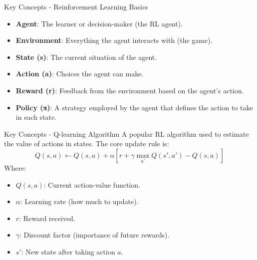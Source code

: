 \documentclass[aspectratio=169]{beamer}
\begin{document}
\begin{frame}{Key Concepts - Reinforcement Learning Basics}
    \begin{itemize}
        \item \textbf{Agent}: The learner or decision-maker (the RL agent).
        \item \textbf{Environment}: Everything the agent interacts with (the game).
        \item \textbf{State (s)}: The current situation of the agent.
        \item \textbf{Action (a)}: Choices the agent can make.
        \item \textbf{Reward (r)}: Feedback from the environment based on the agent's action.
        \item \textbf{Policy (π)}: A strategy employed by the agent that defines the action to take in each state.
    \end{itemize}
\end{frame}

\begin{frame}{Key Concepts - Q-learning Algorithm}
    A popular RL algorithm used to estimate the value of actions in states. The core update rule is:
    \begin{equation}
        Q(s, a) \leftarrow Q(s, a) + \alpha \left[ r + \gamma \max_{a'} Q(s', a') - Q(s, a) \right]
    \end{equation}
    Where:
    \begin{itemize}
        \item $Q(s, a)$: Current action-value function.
        \item $\alpha$: Learning rate (how much to update).
        \item $r$: Reward received.
        \item $\gamma$: Discount factor (importance of future rewards).
        \item $s'$: New state after taking action $a$.
    \end{itemize}
\end{frame}
\end{document}
